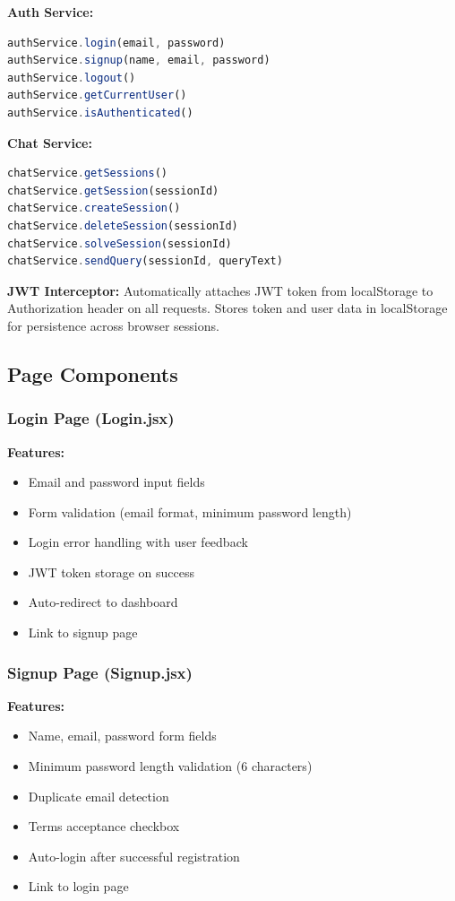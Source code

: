 \documentclass[12pt,a4paper]{article}
\begin{document}
\textbf{Auth Service:}
\begin{lstlisting}[language=javascript]
authService.login(email, password)
authService.signup(name, email, password)
authService.logout()
authService.getCurrentUser()
authService.isAuthenticated()
\end{lstlisting}

\textbf{Chat Service:}
\begin{lstlisting}[language=javascript]
chatService.getSessions()
chatService.getSession(sessionId)
chatService.createSession()
chatService.deleteSession(sessionId)
chatService.solveSession(sessionId)
chatService.sendQuery(sessionId, queryText)
\end{lstlisting}

\textbf{JWT Interceptor:} Automatically attaches JWT token from localStorage to Authorization header on all requests. Stores token and user data in localStorage for persistence across browser sessions.

\subsection{Page Components}

\subsubsection{Login Page (Login.jsx)}

\textbf{Features:}
\begin{itemize}
    \item Email and password input fields
    \item Form validation (email format, minimum password length)
    \item Login error handling with user feedback
    \item JWT token storage on success
    \item Auto-redirect to dashboard
    \item Link to signup page
\end{itemize}

\subsubsection{Signup Page (Signup.jsx)}

\textbf{Features:}
\begin{itemize}
    \item Name, email, password form fields
    \item Minimum password length validation (6 characters)
    \item Duplicate email detection
    \item Terms acceptance checkbox
    \item Auto-login after successful registration
    \item Link to login page
\end{itemize}
\end{document}
